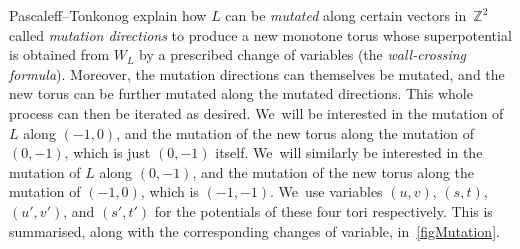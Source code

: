 \documentclass[JEP,XML,SOM,Unicode,NoEqCountersInSection,NoFloatCountersInSection,published]{cedram}
\theoremstyle{definition}
\newcommand{\ZZ}{\mathbb{Z}}
\begin{document}
Pascaleff--Tonkonog \cite[\S 4]{PascaleffTonkonog} explain how $L$ can be \emph{mutated} along certain vectors in~$\ZZ^2$ called \emph{mutation directions} to produce a new monotone torus whose superpotential is obtained from $W_L$ by a prescribed change of variables (the \emph{wall-crossing formula}). Moreover, the mutation directions can themselves be mutated, and the new torus can be further mutated along the mutated directions. This whole process can then be iterated as desired. We~will be interested in the mutation of $L$ along $(-1, 0)$, and the mutation of the new torus along the mutation of $(0, -1)$, which is just $(0, -1)$ itself. We~will similarly be interested in the mutation of $L$ along $(0, -1)$, and the mutation of the new torus along the mutation of $(-1, 0)$, which is $(-1, -1)$. We~use variables $(u, v)$, $(s, t)$, $(u', v')$, and $(s', t')$ for the potentials of these four tori respectively. This is summarised, along with the corresponding changes of variable, in~\cref{figMutation}.
\end{document}
